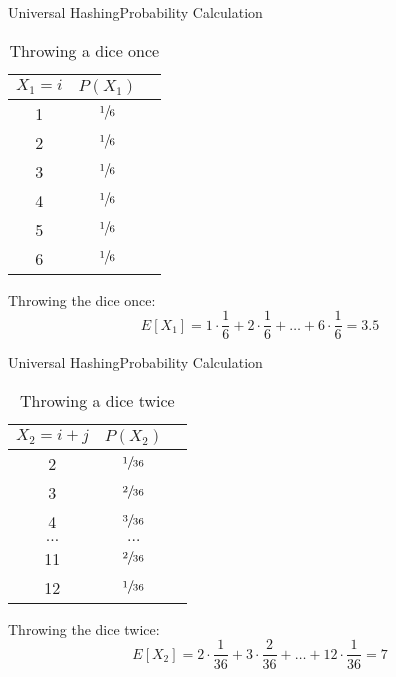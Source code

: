 
\begin{frame}{Universal Hashing}{Probability Calculation}
  \vspace*{-1.5em}
  \begin{table}[!h]
    \caption{Throwing a dice once}
    \label{tab:probabilities:value_rolling_dice_once}
    \begin{tabularx}{0.25\linewidth}{c|cc}
      {\color{Mittel-Blau}$X_1 = i$} & {\color{Mittel-Blau}$P(X_1)$}\\
      \midrule
      1 & $\sfrac{1}{6}$\\
      2 & $\sfrac{1}{6}$\\
      3 & $\sfrac{1}{6}$\\
      4 & $\sfrac{1}{6}$\\
      5 & $\sfrac{1}{6}$\\
      6 & $\sfrac{1}{6}$\\
    \end{tabularx}
  \end{table}
  Throwing the dice once:
  {\color{Mittel-Blau}\[E[X_1] = 1 \cdot \frac{1}{6} + 2 \cdot \frac{1}{6}
    + \dots + 6 \cdot \frac{1}{6} = 3.5\]}
\end{frame}


\begin{frame}{Universal Hashing}{Probability Calculation}
  \vspace*{-1.5em}
  \begin{table}[!h]
    \caption{Throwing a dice twice}
    \label{tab:probabilities:value_rolling_dice_twice}
    \begin{tabularx}{0.275\linewidth}{c|cc}
      {\color{Mittel-Blau}$X_2 = i + j$ }&{\color{Mittel-Blau} $P(X_2)$}\\
      \midrule
      2 & $\sfrac{1}{36}$\\
      3 & $\sfrac{2}{36}$\\
      4 & $\sfrac{3}{36}$\\
      $\dots$ & $\dots$\\
      11 & $\sfrac{2}{36}$\\
      12 & $\sfrac{1}{36}$\\
    \end{tabularx}
  \end{table}
  Throwing the dice twice:
  {\color{Mittel-Blau}\[E[X_2] = 2 \cdot \frac{1}{36} + 3 \cdot \frac{2}{36}
    + \dots + 12 \cdot \frac{1}{36} = 7\]}
\end{frame}

